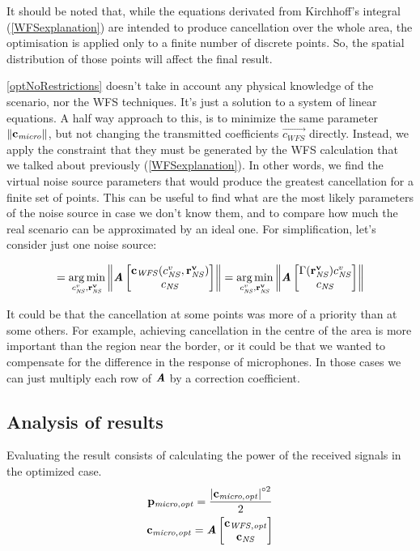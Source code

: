 It should be noted that, while the equations derivated from Kirchhoff's integral (\autoref{WFSexplanation}) are intended to produce cancellation over the whole area, the optimisation is applied only to a finite number of discrete points. So, the spatial distribution of those points will affect the final result.

\autoref{optNoRestrictions} doesn't take in account any physical knowledge of the scenario, nor the WFS techniques. It's just a solution to a system of linear equations. A half way approach to this, is to minimize the same parameter $\left\| \mathbf{c_\mathit{micro}} \right\|$, but not changing the transmitted coefficients $\vec{c_{\mathit{WFS}}}$ directly. Instead, we apply the constraint that they must be generated by the WFS calculation that we talked about previously (\autoref{WFSexplanation}). In other words, we find the virtual noise source parameters that would produce the greatest cancellation for a finite set of points. This can be useful to find what are the most likely parameters of the noise source in case we don't know them, and to compare how much the real scenario can be approximated by an ideal one. For simplification, let's consider just one noise source:

\begin{equation}
[\cnsScalar^v, \vec{r_{\mathit{NS}}^v}] =
\argmin_{\cnsScalar^v, \vec{r_{\mathit{NS}}^v}}
\norm{\myMatrix{A}
	\begin{bmatrix}
	\vec{c_\mathit{WFS}}(\cnsScalar^v, \vec{r_{\mathit{NS}}^v})\\
	\cnsScalar\\
	\end{bmatrix}
} =
\argmin_{\cnsScalar^v, \vec{r_{\mathit{NS}}^v}}
\norm{\myMatrix{A}
	\begin{bmatrix}
	\wfsNormCoef[mat](\vec{r_{\mathit{NS}}^v})\cnsScalar^v\\
	\cnsScalar\\
	\end{bmatrix}
}
\end{equation}

It could be that the cancellation at some points was more of a priority than at some others. For example, achieving cancellation in the centre of the area is more important than the region near the border, or it could be that we wanted to compensate for the difference in the response of microphones. In those cases we can just multiply each row of $\bm{\mathit{A}}$ by a correction coefficient.

\subsection{Analysis of results}
Evaluating the result consists of calculating the power of the received signals in the optimized case.
\begin{gather}
	\mathbf{p_\mathit{micro,opt}} = \frac{\left| \mathbf{c_{\mathit{micro,opt}}} \right|^{\circ 2}}{2}
	\\
	\mathbf{c_\mathit{\mathit{micro,opt}}} = \bm{\mathit{A}}
	\begin{bmatrix}
	\mathbf{c_\mathit{WFS,opt}} \\
	\mathbf{c_{\mathit{NS}}}
	\end{bmatrix}
\end{gather}


